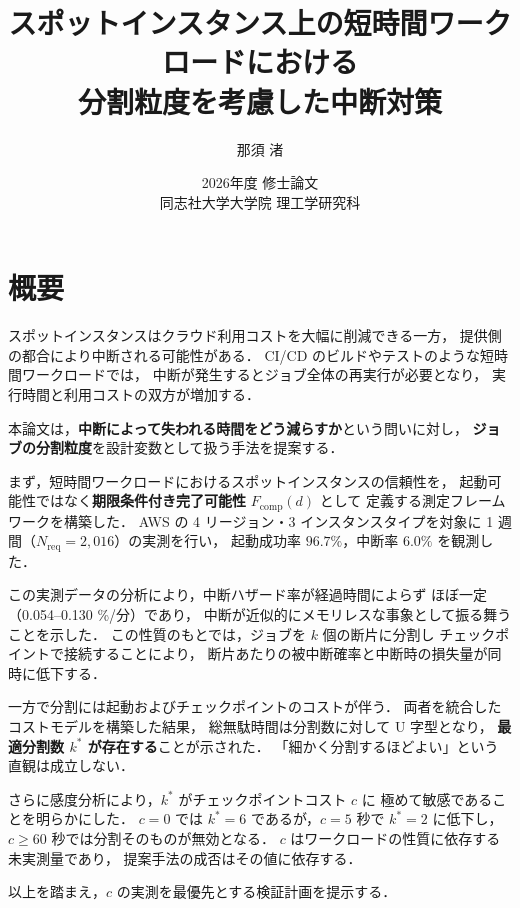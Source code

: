 \documentclass[11pt,a4paper]{ltjsreport}
\title{\vspace{-10mm}
スポットインスタンス上の短時間ワークロードにおける\\
分割粒度を考慮した中断対策}
\author{那須 渚}
\date{2026年度 修士論文\\[2mm] 同志社大学大学院 理工学研究科}
\newcommand{\Fcomp}{F_{\mathrm{comp}}}
\newcommand{\Nreq}{N_{\mathrm{req}}}
\begin{document}
\maketitle

\chapter*{概要}

スポットインスタンスはクラウド利用コストを大幅に削減できる一方，
提供側の都合により中断される可能性がある．
CI/CD のビルドやテストのような短時間ワークロードでは，
中断が発生するとジョブ全体の再実行が必要となり，
実行時間と利用コストの双方が増加する．

本論文は，\textbf{中断によって失われる時間をどう減らすか}という問いに対し，
\textbf{ジョブの分割粒度}を設計変数として扱う手法を提案する．

まず，短時間ワークロードにおけるスポットインスタンスの信頼性を，
起動可能性ではなく\textbf{期限条件付き完了可能性} $\Fcomp(d)$ として
定義する測定フレームワークを構築した．
AWS の 4 リージョン・3 インスタンスタイプを対象に
1 週間（$\Nreq = 2{,}016$）の実測を行い，
起動成功率 $96.7\%$，中断率 $6.0\%$ を観測した．

この実測データの分析により，中断ハザード率が経過時間によらず
ほぼ一定（0.054--0.130 \%/分）であり，
中断が近似的にメモリレスな事象として振る舞うことを示した．
この性質のもとでは，ジョブを $k$ 個の断片に分割し
チェックポイントで接続することにより，
断片あたりの被中断確率と中断時の損失量が同時に低下する．

一方で分割には起動およびチェックポイントのコストが伴う．
両者を統合したコストモデルを構築した結果，
総無駄時間は分割数に対して U 字型となり，
\textbf{最適分割数 $k^{*}$ が存在する}ことが示された．
「細かく分割するほどよい」という直観は成立しない．

さらに感度分析により，$k^{*}$ がチェックポイントコスト $c$ に
極めて敏感であることを明らかにした．
$c = 0$ では $k^{*} = 6$ であるが，$c = 5$ 秒で $k^{*} = 2$ に低下し，
$c \geq 60$ 秒では分割そのものが無効となる．
$c$ はワークロードの性質に依存する未実測量であり，
提案手法の成否はその値に依存する．

以上を踏まえ，$c$ の実測を最優先とする検証計画を提示する．

\tableofcontents
\listoffigures
\listoftables
\end{document}
